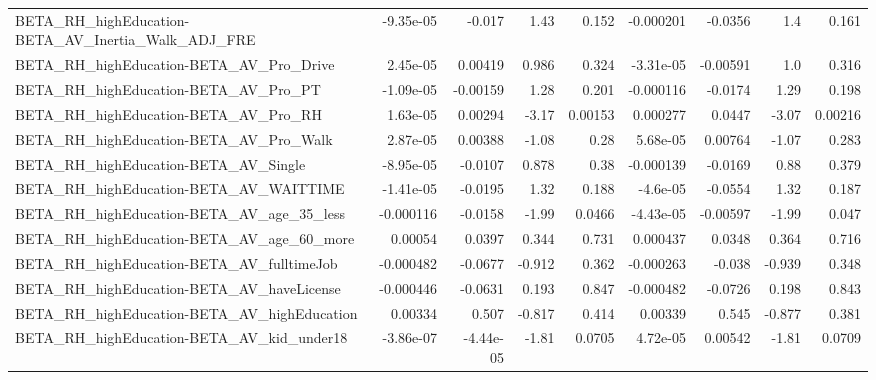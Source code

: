 \begin{tabular}{lrrrrrrrr}
BETA\_RH\_highEducation-BETA\_AV\_Inertia\_Walk\_ADJ\_FRE &   -9.35e-05 &       -0.017 &     1.43 &    0.152 &  -0.000201 &     -0.0356 &          1.4 &         0.161 \\
BETA\_RH\_highEducation-BETA\_AV\_Pro\_Drive            &    2.45e-05 &      0.00419 &    0.986 &    0.324 &  -3.31e-05 &    -0.00591 &          1.0 &         0.316 \\
BETA\_RH\_highEducation-BETA\_AV\_Pro\_PT               &   -1.09e-05 &     -0.00159 &     1.28 &    0.201 &  -0.000116 &     -0.0174 &         1.29 &         0.198 \\
BETA\_RH\_highEducation-BETA\_AV\_Pro\_RH               &    1.63e-05 &      0.00294 &    -3.17 &  0.00153 &   0.000277 &      0.0447 &        -3.07 &       0.00216 \\
BETA\_RH\_highEducation-BETA\_AV\_Pro\_Walk             &    2.87e-05 &      0.00388 &    -1.08 &     0.28 &   5.68e-05 &     0.00764 &        -1.07 &         0.283 \\
BETA\_RH\_highEducation-BETA\_AV\_Single               &   -8.95e-05 &      -0.0107 &    0.878 &     0.38 &  -0.000139 &     -0.0169 &         0.88 &         0.379 \\
BETA\_RH\_highEducation-BETA\_AV\_WAITTIME             &   -1.41e-05 &      -0.0195 &     1.32 &    0.188 &   -4.6e-05 &     -0.0554 &         1.32 &         0.187 \\
BETA\_RH\_highEducation-BETA\_AV\_age\_35\_less          &   -0.000116 &      -0.0158 &    -1.99 &   0.0466 &  -4.43e-05 &    -0.00597 &        -1.99 &         0.047 \\
BETA\_RH\_highEducation-BETA\_AV\_age\_60\_more          &     0.00054 &       0.0397 &    0.344 &    0.731 &   0.000437 &      0.0348 &        0.364 &         0.716 \\
BETA\_RH\_highEducation-BETA\_AV\_fulltimeJob          &   -0.000482 &      -0.0677 &   -0.912 &    0.362 &  -0.000263 &      -0.038 &       -0.939 &         0.348 \\
BETA\_RH\_highEducation-BETA\_AV\_haveLicense          &   -0.000446 &      -0.0631 &    0.193 &    0.847 &  -0.000482 &     -0.0726 &        0.198 &         0.843 \\
BETA\_RH\_highEducation-BETA\_AV\_highEducation        &     0.00334 &        0.507 &   -0.817 &    0.414 &    0.00339 &       0.545 &       -0.877 &         0.381 \\
BETA\_RH\_highEducation-BETA\_AV\_kid\_under18          &   -3.86e-07 &    -4.44e-05 &    -1.81 &   0.0705 &   4.72e-05 &     0.00542 &        -1.81 &        0.0709 \\

\end{tabular}
